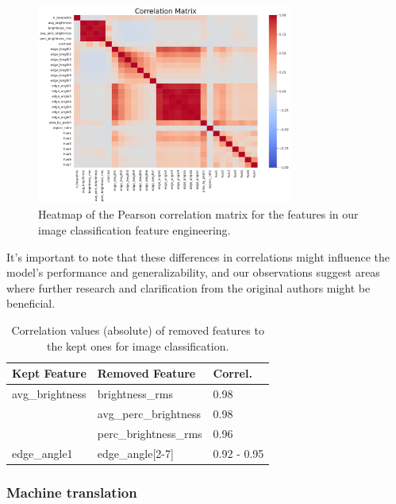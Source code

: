 \begin{figure}[h]
    \centering
    \includegraphics[width=0.75\textwidth]{figures/cv_corr_matrix.pdf}
    \caption{Heatmap of the Pearson correlation matrix for the features in our image classification feature engineering.}
    \label{fig:correlation_matrix}
\end{figure}

It's important to note that these differences in correlations might influence the model's performance and generalizability, and our observations suggest areas where further research and clarification from the original authors might be beneficial.

\begin{table}[h]
    \centering
    \caption{Correlation values (absolute) of removed features to the kept ones for image classification.}
    \begin{tabular}{lll}
        \hline
        \textbf{Kept Feature} & \textbf{Removed Feature} & \textbf{Correl.} \\ \hline
        avg\_brightness       & brightness\_rms          & 0.98             \\
                              & avg\_perc\_brightness    & 0.98             \\
                              & perc\_brightness\_rms    & 0.96             \\
        edge\_angle1          & edge\_angle[2-7]         & 0.92 - 0.95      \\ \hline
    \end{tabular}
\end{table}



\subsubsection{Machine translation}

